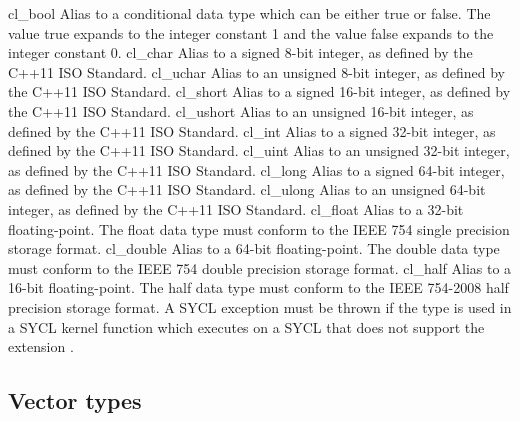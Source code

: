 \addRow
{
  cl_bool
}
{
  Alias to a conditional data type which can be either true or false. The value
  true expands to the integer constant 1 and the value false expands to the
  integer constant 0.
}
\addRow
{
  cl_char
}
{
  Alias to a signed 8-bit integer, as defined by the C++11 ISO Standard.
}
\addRow
{
  cl_uchar
}
{
  Alias to an unsigned 8-bit integer, as defined by the C++11 ISO Standard.
}
\addRow
{
 cl_short
}
{
  Alias to a signed 16-bit integer, as defined by the C++11 ISO Standard.
}
\addRow
{
  cl_ushort
}
{
  Alias to an unsigned 16-bit integer, as defined by the C++11 ISO Standard.
}
\addRow
{
 cl_int
}
{
  Alias to a signed 32-bit integer, as defined by the C++11 ISO Standard.
}
\addRow
{
 cl_uint
}
{
  Alias to an unsigned 32-bit integer, as defined by the C++11 ISO Standard.
}
\addRow
{
 cl_long
}
{
  Alias to a signed 64-bit integer, as defined by the C++11 ISO Standard.
}
\addRow
{
 cl_ulong
}
{
  Alias to an unsigned 64-bit integer, as defined by the C++11 ISO Standard.
}
\addRow
{
  cl_float
}
{
  Alias to a 32-bit floating-point. The float data type must conform to the IEEE
  754 single precision storage format.
}
\addRow
{
 cl_double
}
{
  Alias to a 64-bit floating-point. The double data type must conform to the IEEE
  754 double precision storage format.
}
\addRow
{
  cl_half
}
{
  Alias to a 16-bit floating-point. The half data type must conform to the IEEE
  754-2008 half precision storage format. A SYCL 
  exception must be thrown if the  type is used in a SYCL kernel
  function which executes on a SYCL  that does not support the
  extension .
}
\completeTable

\subsection{Vector types}
\label{sec:vector.type}


